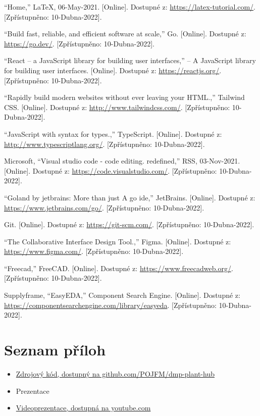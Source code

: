 \documentclass[12pt,a4paper]{article}
\begin{document}
\begin{thebibliography}{9}
	\vspace*{-1.5cm}
	“Home,” LaTeX, 06-May-2021. [Online]. Dostupné z: \href{https://latex-tutorial.com/}{https://latex-tutorial.com/}. [Zpřístupněno: 10-Dubna-2022]. 

	“Build fast, reliable, and efficient software at scale,” Go. [Online]. Dostupné z: \href{https://go.dev/}{https://go.dev/}. [Zpřístupněno: 10-Dubna-2022]. 

	“React – a JavaScript library for building user interfaces,” – A JavaScript library for building user interfaces. [Online]. Dostupné z: \href{https://reactjs.org/}{https://reactjs.org/}. [Zpřístupněno: 10-Dubna-2022]. 

	“Rapidly build modern websites without ever leaving your HTML.,” Tailwind CSS. [Online]. Dostupné z: \href{http://www.tailwindcss.com/}{http://www.tailwindcss.com/}. [Zpřístupněno: 10-Dubna-2022]. 

	“JavaScript with syntax for types.,” TypeScript. [Online]. Dostupné z: \href{http://www.typescriptlang.org/}{http://www.typescriptlang.org/}. [Zpřístupněno: 10-Dubna-2022]. 

	Microsoft, “Visual studio code - code editing. redefined,” RSS, 03-Nov-2021. [Online]. Dostupné z: \href{https://code.visualstudio.com/}{https://code.visualstudio.com/}. [Zpřístupněno: 10-Dubna-2022]. 

	“Goland by jetbrains: More than just A go ide,” JetBrains. [Online]. Dostupné z: \href{https://www.jetbrains.com/go/}{https://www.jetbrains.com/go/}. [Zpřístupněno: 10-Dubna-2022]. 

	Git. [Online]. Dostupné z: \href{https://git-scm.com/}{https://git-scm.com/}. [Zpřístupněno: 10-Dubna-2022]. 

	“The Collaborative Interface Design Tool.,” Figma. [Online]. Dostupné z: \href{https://www.figma.com/}{https://www.figma.com/}. [Zpřístupněno: 10-Dubna-2022]. 

	“Freecad,” FreeCAD. [Online]. Dostupné z: \href{https://www.freecadweb.org/}{https://www.freecadweb.org/}. [Zpřístupněno: 10-Dubna-2022]. 

	Supplyframe, “EasyEDA,” Component Search Engine. [Online]. Dostupné z: \href{https://componentsearchengine.com/library/easyeda}{https://componentsearchengine.com/library/easyeda}. [Zpřístupněno: 10-Dubna-2022]. 
\end{thebibliography}

\section{Seznam příloh}

\begin{itemize}
	\item \href{https://github.com/POJFM/dmp-plant-hub}{Zdrojový kód, dostupný na github.com/POJFM/dmp-plant-hub}
	\item Prezentace
	\item \href{https://www.youtube.com/watch?v=oo2_pDX5OE4}{Videoprezentace, dostupná na youtube.com}
\end{itemize}
\end{document}
